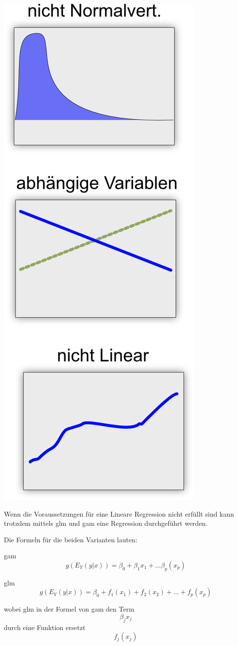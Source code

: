 \documentclass[
  12pt, %
  a4paper, %
  oneside, %
  openany, 
  numbers=noenddot, %
  BCOR=5mm, %
  parskip=half*, %
  thesis, %
]{bfhbook}
\begin{document}
\begin{minipage}[t]{0.3\linewidth}
\vspace{0pt}
\includegraphics[width=0.6\linewidth]{Bilder/Regressions-Auschluss-Bedingungen.png}
\end{minipage}\hfill
\begin{minipage}[t]{0.55\linewidth}
\vspace{0pt}
Wenn die Voraussetzungen für eine Lineare Regression nicht erfüllt sind kann trotzdem mittels \Gls{glm} und \Gls{gam} eine Regression durchgeführt werden.

Die Formeln für die beiden Varianten lauten:

\acrshort{gam} \[g(E_Y(y|x))=\beta_0+\beta_1x_1+…\beta_p(x_p)\]

\acrshort{glm} \[g(E_Y(y|x))=\beta_0+f_1(x_1)+f_2(x_2)+…+f_p(x_p)\]

wobei \acrshort{glm} in der Formel von \acrshort{gam} den Term \[\beta_jx_j\] durch eine Funktion ersetzt \[f_j(x_j)\]
\end{minipage}
\end{document}
